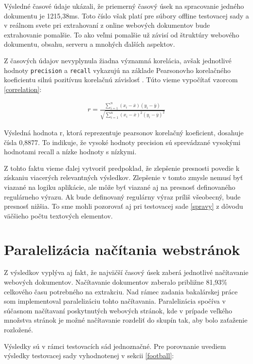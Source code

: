 Výsledné časové údaje ukázali, že priemerný časový úsek na spracovanie jedného dokumentu je 1215,38ms. Toto číslo však platí pre súbory offline testovacej sady a v reálnom svete pri extrahovaní z online webových dokumentov bude extrahovanie pomalšie. To ako veľmi pomalšie už závisí od štruktúry webového dokumentu, obsahu, serveru a mnohých ďalších aspektov.

Z časových údajov nevyplynula žiadna významná korelácia, avšak jednotlivé hodnoty \texttt{precision} a \texttt{recall} vykazujú na základe Pearsonovho korelačného koeficientu silnú pozitívnu korelačnú závislosť \cite{statistics}. Túto vieme vypočítať vzorcom \ref{correlation}:

\begin{eqnarray}
\label{correlation}
    r = \frac{{}\sum_{i=1}^{n} (x_i - \overline{x})(y_i - \overline{y})}
{\sqrt{\sum_{i=1}^{n} (x_i - \overline{x})^2(y_i - \overline{y})^2}}
    \end{eqnarray}

Výsledná hodnota r, ktorá reprezentuje pearsonov korelačný koeficient, dosahuje čísla 0,8877. To indikuje, že vysoké hodnoty precision sú sprevádzané vysokými hodnotami recall a nízke hodnoty s nízkymi. 

Z tohto faktu vieme ďalej vytvoriť predpoklad, že zlepšenie presnosti povedie k získaniu viacerých relevantných výsledkov. Zlepšenie v tomto zmysle nemusí byť viazané na logiku aplikácie, ale môže byť viazané aj na presnosť definovaného regulárneho výrazu. Ak bude definovaný regulárny výraz príliš všeobecný, bude presnosť nižšia. To sme mohli pozorovať aj pri testovacej sade  \ref{spravy} z dôvodu väčšieho počtu textových elementov.

\newpage
\section{Paralelizácia načítania webstránok}

Z výsledkov vyplýva aj fakt, že najväčší časový úsek zaberá jednotlivé načítavanie webových dokumentov. Načítavanie dokumentov zaberalo približne 81,93\% celkového času potrebného na extrakciu. Nad rámec zadania bakalárskej práce som implementoval paralelizáciu tohto načítavania. Paralelizácia spočíva v súčasnom načítavaní poskytnutých webových stránok, kde v prípade veľkého množstva stránok je možné načítavanie rozdeliť do skupín tak, aby bolo zaťaženie rozložené.

Výsledky sú v rámci testovacích sád jednoznačné. Pre porovnanie uvediem výsledky testovacej sady  vyhodnotenej v sekcii \ref{football}:


